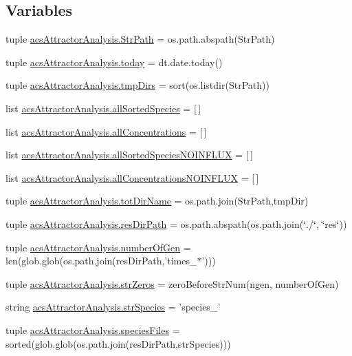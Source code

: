 \subsection*{Variables}
\begin{DoxyCompactItemize}
\item 
tuple \hyperlink{a00090_a60fb7d39ab8835d4b764461220e796e2}{acs\-Attractor\-Analysis.\-Str\-Path} = os.\-path.\-abspath(Str\-Path)
\item 
tuple \hyperlink{a00090_a71bc5e3d205016fb7893b438e75be78e}{acs\-Attractor\-Analysis.\-today} = dt.\-date.\-today()
\item 
tuple \hyperlink{a00090_ac88c3245a42ebefee3fcf90626f6eaf4}{acs\-Attractor\-Analysis.\-tmp\-Dirs} = sort(os.\-listdir(Str\-Path))
\item 
list \hyperlink{a00090_aafc595063b7c4b74f94c0931ff2370a5}{acs\-Attractor\-Analysis.\-all\-Sorted\-Species} = \mbox{[}$\,$\mbox{]}
\item 
list \hyperlink{a00090_ae708f0b0e671f432735f039e1ff6b6ca}{acs\-Attractor\-Analysis.\-all\-Concentrations} = \mbox{[}$\,$\mbox{]}
\item 
list \hyperlink{a00090_a02a8db664a67956bc698b79f7c31a7bd}{acs\-Attractor\-Analysis.\-all\-Sorted\-Species\-N\-O\-I\-N\-F\-L\-U\-X} = \mbox{[}$\,$\mbox{]}
\item 
list \hyperlink{a00090_acda16f4751633455ab19e92bdc5baf2a}{acs\-Attractor\-Analysis.\-all\-Concentrations\-N\-O\-I\-N\-F\-L\-U\-X} = \mbox{[}$\,$\mbox{]}
\item 
tuple \hyperlink{a00090_ad3caf9c42727aaab24f4ea4dae362fc9}{acs\-Attractor\-Analysis.\-tot\-Dir\-Name} = os.\-path.\-join(Str\-Path,tmp\-Dir)
\item 
tuple \hyperlink{a00090_a35eb3b681c7408f1476b92798d4f2c16}{acs\-Attractor\-Analysis.\-res\-Dir\-Path} = os.\-path.\-abspath(os.\-path.\-join(\char`\"{}./\char`\"{}, \char`\"{}res\char`\"{}))
\item 
tuple \hyperlink{a00090_ac014a9b46a060e4fed96eaee9614345b}{acs\-Attractor\-Analysis.\-number\-Of\-Gen} = len(glob.\-glob(os.\-path.\-join(res\-Dir\-Path,'times\-\_\-$\ast$')))
\item 
tuple \hyperlink{a00090_a5708d1d44920d75a918ec1c988c02c57}{acs\-Attractor\-Analysis.\-str\-Zeros} = zero\-Before\-Str\-Num(ngen, number\-Of\-Gen)
\item 
string \hyperlink{a00090_aa76707ba3058ba96fc8e5aeafa461193}{acs\-Attractor\-Analysis.\-str\-Species} = 'species\-\_\-'
\item 
tuple \hyperlink{a00090_a670249d163388a9d93c8f3b9fb63afac}{acs\-Attractor\-Analysis.\-species\-Files} = sorted(glob.\-glob(os.\-path.\-join(res\-Dir\-Path,str\-Species)))

\end{DoxyCompactItemize}
